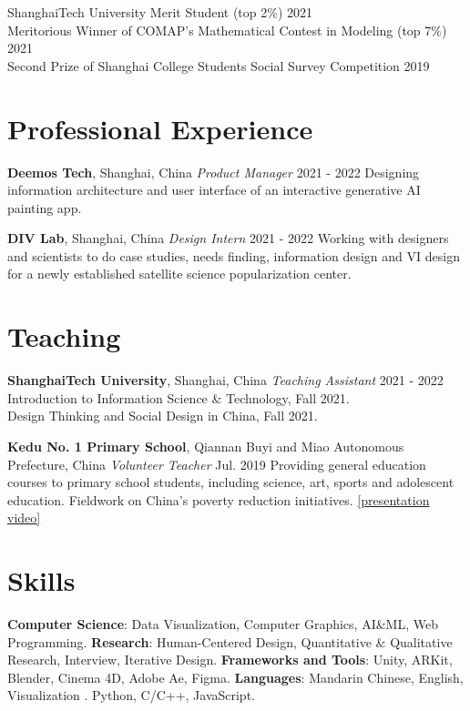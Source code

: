 \documentclass[margin,line]{res}
\newcommand{\link}[2]{\href{#2}{\textcolor{themecolor}{#1}}}
\newcommand{\SectionTitle}[1]{
\vspace{-.1cm}
\section{#1}
\vspace{.2cm}
}
\newcommand{\ProfItem}[5]{
  \vspace{-.2cm}
  {\bf #1}, #2 \vspace{.1cm} \newline
  {\em #3} \hfill {#4} \newline
  #5
}
\newcommand{\ServiceItem}[5]{
  \vspace{-.2cm}
  {\bf #1}, #2 \vspace{.1cm} \newline
  {\em #3} \hfill {#4} \newline
  #5
}
\begin{document}
\begin{resume}
ShanghaiTech University Merit Student (top 2\%) \hfill 2021 \\
Meritorious Winner of COMAP's Mathematical Contest in Modeling (top 7\%) \hfill 2021\\
Second Prize of Shanghai College Students Social Survey Competition \hfill 2019


\SectionTitle{Professional Experience}

\ProfItem{Deemos Tech}{Shanghai, China}{Product Manager}{2021 - 2022}{Designing information architecture and user interface of an interactive generative AI painting app.}

\ProfItem{DIV Lab}{Shanghai, China}{Design Intern}{2021 - 2022}{Working with designers and scientists to do case studies, needs finding, information design and VI design for a newly established satellite science popularization center.}


\SectionTitle{Teaching} 

\ServiceItem{ShanghaiTech University}{Shanghai, China}{Teaching Assistant}{2021 - 2022}{Introduction to Information Science \& Technology, Fall 2021.\\ Design Thinking and Social Design in China, Fall 2021.}

\ServiceItem{Kedu No. 1 Primary School}{Qiannan Buyi and Miao Autonomous Prefecture, China}{Volunteer Teacher}{Jul. 2019}{Providing general education courses to primary school students, including science, art, sports and adolescent education. Fieldwork on China's poverty reduction initiatives. \link{[presentation video]}{https://www.bilibili.com/video/BV16J411U7kX/}}


\SectionTitle{Skills} 
\vspace{-.2cm}

\textbf{Computer Science}: Data Visualization, Computer Graphics, AI\&ML, Web Programming.
\vspace{.15cm} \newline
\textbf{Research}: Human-Centered Design, Quantitative \& Qualitative Research, Interview, Iterative Design.
\vspace{.15cm} \newline
\textbf{Frameworks and Tools}: Unity, ARKit, Blender, Cinema 4D, Adobe Ae, Figma.
\vspace{.15cm} \newline
\textbf{Languages}: Mandarin Chinese, English, Visualization \raisebox{-0.5ex}{}. Python, C/C++, JavaScript.

\end{resume}
\end{document}

